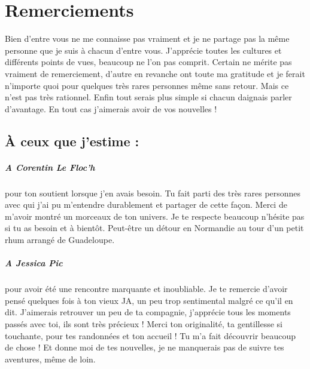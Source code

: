 \documentclass[../thesis.tex]{subfiles}
\begin{document}
	
\chapter*{Remerciements}
\label{chap:Remerciements}

Bien d'entre vous ne me connaisse pas vraiment et je ne partage pas la même personne que je suis à chacun d'entre vous.
J'apprécie toutes les cultures et différents points de vues, beaucoup ne l'on pas comprit.
Certain ne mérite pas vraiment de remerciement, d'autre en revanche ont toute ma gratitude
et je ferait n'importe quoi pour quelques très rares personnes même sans retour. Mais ce n'est pas très rationnel.
Enfin tout serais plus simple si chacun daignais parler d'avantage.
En tout cas j'aimerais avoir de vos nouvelles !

\section*{À ceux que j'estime :}

\paragraph{A Corentin Le Floc'h} pour ton soutient lorsque j'en avais besoin.
Tu fait parti des très rares personnes avec qui j'ai pu m'entendre durablement et partager de cette façon.
Merci de m'avoir montré un morceaux de ton univers.
Je te respecte beaucoup n'hésite pas si tu as besoin et à bientôt.
Peut-être un détour en Normandie au tour d'un petit rhum arrangé de Guadeloupe.

\paragraph{A Jessica Pic}
pour avoir été une rencontre marquante et inoubliable.
Je te remercie d'avoir pensé quelques fois à ton vieux JA, un peu trop sentimental malgré ce qu'il en dit.
J'aimerais retrouver un peu de ta compagnie, j'apprécie tous les moments passés avec toi, ils sont très précieux !
Merci ton originalité, ta gentillesse si touchante, pour tes randonnées et ton accueil !
Tu m'a fait découvrir beaucoup de chose !
Et donne moi de tes nouvelles, je ne manquerais pas de suivre tes aventures, même de loin.

\end{document}
